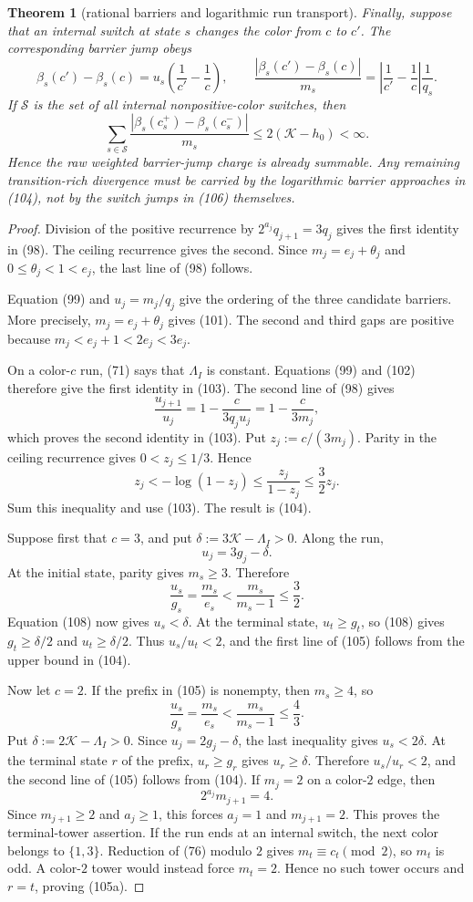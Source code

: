 \documentclass[11pt]{article}
\newtheorem{theorem}{Theorem}
\begin{document}
\begin{theorem}[rational barriers and logarithmic run transport]
Finally, suppose that an internal switch at state $s$ changes the color from
$c$ to $c'$.  The corresponding barrier jump obeys
\[
\boxed{
  \beta_s(c')-\beta_s(c)
  =u_s\left(\frac1{c'}-\frac1c\right),
  \qquad
  \frac{|\beta_s(c')-\beta_s(c)|}{m_s}
  =\left|\frac1{c'}-\frac1c\right|\frac1{q_s}.}
\tag{106}
\]
If $\mathcal S$ is the set of all internal nonpositive-color switches, then
\[
\boxed{
  \sum_{s\in\mathcal S}
  \frac{|\beta_s(c_s^+)-\beta_s(c_s^-)|}{m_s}
  \leq2(\mathcal K-h_0)<\infty.}
\tag{107}
\]
Hence the raw weighted barrier-jump charge is already summable.  Any
remaining transition-rich divergence must be carried by the logarithmic
barrier approaches in (104), not by the switch jumps in (106) themselves.
\end{theorem}

\begin{proof}
Division of the positive recurrence by
$2^{a_j}q_{j+1}=3q_j$ gives the first identity in (98).  The ceiling
recurrence gives the second.  Since $m_j=e_j+\theta_j$ and
$0\leq\theta_j<1<e_j$, the last line of (98) follows.

Equation (99) and $u_j=m_j/q_j$ give the ordering of the three candidate
barriers.  More precisely, $m_j=e_j+\theta_j$ gives (101).  The second and
third gaps are positive because $m_j<e_j+1<2e_j<3e_j$.

On a color-$c$ run, (71) says that $\Lambda_I$ is constant.  Equations
(99) and (102) therefore give the first identity in (103).  The second line
of (98) gives
\[
  \frac{u_{j+1}}{u_j}
  =1-\frac{c}{3q_ju_j}
  =1-\frac{c}{3m_j},
\]
which proves the second identity in (103).  Put
$z_j:=c/(3m_j)$.  Parity in the ceiling recurrence gives
$0<z_j\leq1/3$.  Hence
\[
  z_j< -\log(1-z_j)\leq\frac{z_j}{1-z_j}
  \leq\frac32z_j.
\]
Sum this inequality and use (103).  The result is (104).

Suppose first that $c=3$, and put
$\delta:=3\mathcal K-\Lambda_I>0$.  Along the run,
\[
  u_j=3g_j-\delta.
\tag{108}
\]
At the initial state, parity gives $m_s\geq3$.  Therefore
\[
  \frac{u_s}{g_s}=\frac{m_s}{e_s}
  <\frac{m_s}{m_s-1}\leq\frac32.
\]
Equation (108) now gives $u_s<\delta$.  At the terminal state,
$u_t\geq g_t$, so (108) gives $g_t\geq\delta/2$ and
$u_t\geq\delta/2$.  Thus $u_s/u_t<2$, and the first line of (105) follows
from the upper bound in (104).

Now let $c=2$.  If the prefix in (105) is nonempty, then $m_s\geq4$, so
\[
  \frac{u_s}{g_s}=\frac{m_s}{e_s}
  <\frac{m_s}{m_s-1}\leq\frac43.
\]
Put $\delta:=2\mathcal K-\Lambda_I>0$.  Since
$u_j=2g_j-\delta$, the last inequality gives $u_s<2\delta$.  At the
terminal state $r$ of the prefix, $u_r\geq g_r$ gives
$u_r\geq\delta$.  Therefore $u_s/u_r<2$, and the second line of (105)
follows from (104).  If $m_j=2$ on a color-$2$ edge, then
\[
  2^{a_j}m_{j+1}=4.
\]
Since $m_{j+1}\geq2$ and $a_j\geq1$, this forces
$a_j=1$ and $m_{j+1}=2$.  This proves the terminal-tower assertion.
If the run ends at an internal switch, the next color belongs to
$\{1,3\}$.  Reduction of (76) modulo $2$ gives
$m_t\equiv c_t\pmod2$, so $m_t$ is odd.  A color-$2$ tower would instead
force $m_t=2$.  Hence no such tower occurs and $r=t$, proving (105a).


\end{proof}
\end{document}
